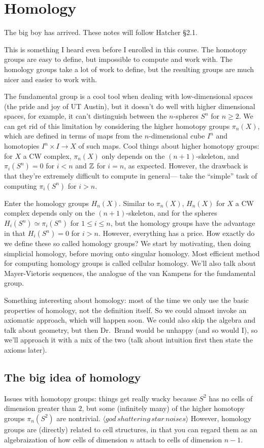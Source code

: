 \section{Homology} 
The big boy has arrived. These notes will follow Hatcher \S 2.1.
\begin{remark}
    This is something I heard even before I enrolled in this course. The homotopy groups are easy to define, but impossible to compute and work with. The homology groups take a lot of work to define, but the resulting groups are much nicer and easier to work with.
\end{remark}
\orbreak
The fundamental group is a cool tool when dealing with low-dimensional spaces (the pride and joy of UT Austin), but it doesn't do well with higher dimensional spaces, for example, it can't distinguish between the $n$-spheres $S^n$ for $n\geq 2$. We can get rid of this limitation by considering the higher homotopy groups $\pi_n(X)$, which are defined in terms of maps from the $n$-dimensional cube $I^n$ and homotopies $I^n \times  I \to X$ of such maps. Cool things about higher homotopy groups: for $X$ a CW complex, $\pi_n(X)$ only depends on the $(n+1)$-skeleton, and $\pi_i(S^n)=0$ for $i<n$ and $\mathbb{Z}$ for $i=n$, as expected. However, the drawback is that they're extremely difficult to compute in general— take the ``simple'' task of computing $\pi_i(S^n)$ for $i>n$.

Enter the homology groups $H_n(X)$. Similar to $\pi_n(X)$, $H_n(X)$ for $X$ a CW complex depends only on the $(n+1)$-skeleton, and for the spheres $H_i(S^n)\simeq \pi_i(S^n)$ for $1\leq i\leq n$, but the homology groups have the advantage in that $H_i(S^n)=0$ for $i>n$. However, everything has a price. How exactly do we define these so called homology groups? We start by motivating, then doing simplicial homology, before moving onto singular homology. Most efficient method for computing homology groups is called cellular homology. We'll also talk about Mayer-Vietoris sequences, the analogue of the van Kampens for the fundamental group.

Something interesting about homology: most of the time we only use the basic properties of homology, not the definition itself. So we could almost invoke an axiomatic approach, which will happen soon. We could also skip the algebra and talk about geometry, but then Dr.\ Brand would be unhappy (and so would I), so we'll approach it with a mix of the two (talk about intuition first then state the axioms later).
\subsection{The big idea of homology}
Issues with homotopy groups: things get really wacky because $S^{2} $ has no cells of dimension greater than $2$, but some (infinitely many) of the higher homotopy groups $\pi_n(S^{2} )$ are nontrivial. $\langle god\, shattering\, star\, noises\rangle $ However, homology groups are (directly) related to cell structures, in that you can regard them as an algebraization of how cells of dimension $n$ attach to cells of dimension $n-1$.

